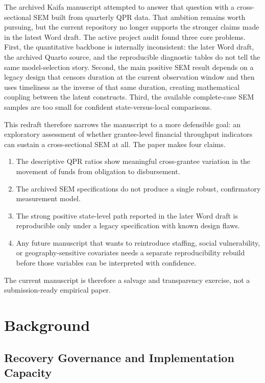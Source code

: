 \documentclass[
  letterpaper,
]{article}
\providecommand{\tightlist}{%
  \setlength{\itemsep}{0pt}\setlength{\parskip}{0pt}}
\begin{document}
The archived Kaifa manuscript attempted to answer that question with a
cross-sectional SEM built from quarterly QPR data. That ambition remains
worth pursuing, but the current repository no longer supports the
stronger claims made in the latest Word draft. The active project audit
found three core problems. First, the quantitative backbone is
internally inconsistent: the later Word draft, the archived Quarto
source, and the reproducible diagnostic tables do not tell the same
model-selection story. Second, the main positive SEM result depends on a
legacy design that censors duration at the current observation window
and then uses timeliness as the inverse of that same duration, creating
mathematical coupling between the latent constructs. Third, the
available complete-case SEM samples are too small for confident
state-versus-local comparisons.

This redraft therefore narrows the manuscript to a more defensible goal:
an exploratory assessment of whether grantee-level financial throughput
indicators can sustain a cross-sectional SEM at all. The paper makes
four claims.

\begin{enumerate}
\def\labelenumi{\arabic{enumi}.}
\tightlist
\item
  The descriptive QPR ratios show meaningful cross-grantee variation in
  the movement of funds from obligation to disbursement.
\item
  The archived SEM specifications do not produce a single robust,
  confirmatory measurement model.
\item
  The strong positive state-level path reported in the later Word draft
  is reproducible only under a legacy specification with known design
  flaws.
\item
  Any future manuscript that wants to reintroduce staffing, social
  vulnerability, or geography-sensitive covariates needs a separate
  reproducibility rebuild before those variables can be interpreted with
  confidence.
\end{enumerate}

The current manuscript is therefore a salvage and transparency exercise,
not a submission-ready empirical paper.

\section{Background}\label{background}

\subsection{Recovery Governance and Implementation
Capacity}\label{recovery-governance-and-implementation-capacity}
\end{document}
